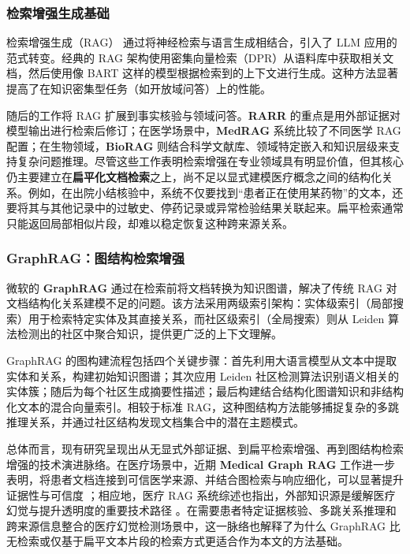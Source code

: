 \documentclass[11pt]{article}
\begin{document}
\subsubsection{检索增强生成基础}

检索增强生成（RAG） \citep{lewis2020retrievalAugmentedGeneration} 通过将神经检索与语言生成相结合，引入了 LLM 应用的范式转变。经典的 RAG 架构使用密集向量检索（DPR）从语料库中获取相关文档，然后使用像 BART 这样的模型根据检索到的上下文进行生成。这种方法显著提高了在知识密集型任务（如开放域问答）上的性能。

随后的工作将 RAG 扩展到事实核验与领域问答。\textbf{RARR} \citep{gao2023rarr} 的重点是用外部证据对模型输出进行检索后修订；在医学场景中，\textbf{MedRAG} \citep{xiong2024medRAG} 系统比较了不同医学 RAG 配置；在生物领域，\textbf{BioRAG} \citep{wang2024bioRAG} 则结合科学文献库、领域特定嵌入和知识层级来支持复杂问题推理。尽管这些工作表明检索增强在专业领域具有明显价值，但其核心仍主要建立在\textbf{扁平化文档检索}之上，尚不足以显式建模医疗概念之间的结构化关系。例如，在出院小结核验中，系统不仅要找到``患者正在使用某药物''的文本，还要将其与其他记录中的过敏史、停药记录或异常检验结果关联起来。扁平检索通常只能返回局部相似片段，却难以稳定恢复这种跨来源关系。

\subsubsection{GraphRAG：图结构检索增强}

微软的 \textbf{GraphRAG} \citep{edge2024graphRAGSummarization} 通过在检索前将文档转换为知识图谱，解决了传统 RAG 对文档结构化关系建模不足的问题。该方法采用两级索引架构：实体级索引（局部搜索）用于检索特定实体及其直接关系，而社区级索引（全局搜索）则从 Leiden 算法检测出的社区中聚合知识，提供更广泛的上下文理解。

GraphRAG 的图构建流程包括四个关键步骤：首先利用大语言模型从文本中提取实体和关系，构建初始知识图谱；其次应用 Leiden 社区检测算法识别语义相关的实体簇；随后为每个社区生成摘要性描述；最后构建结合结构化图谱知识和非结构化文本的混合向量索引。相较于标准 RAG，这种图结构方法能够捕捉复杂的多跳推理关系，并通过社区结构发现文档集合中的潜在主题模式。

总体而言，现有研究呈现出从无显式外部证据、到扁平检索增强、再到图结构检索增强的技术演进脉络。在医疗场景中，近期 \textbf{Medical Graph RAG} 工作进一步表明，将患者文档连接到可信医学来源、并结合图检索与响应细化，可以显著提升证据性与可信度 \citep{wu2025medicalGraphRAG}；相应地，医疗 RAG 系统综述也指出，外部知识源是缓解医疗幻觉与提升透明度的重要技术路径 \citep{amugongo2025healthcareRAGReview}。在需要患者特定证据核验、多跳关系推理和跨来源信息整合的医疗幻觉检测场景中，这一脉络也解释了为什么 GraphRAG 比无检索或仅基于扁平文本片段的检索方式更适合作为本文的方法基础。
\end{document}
